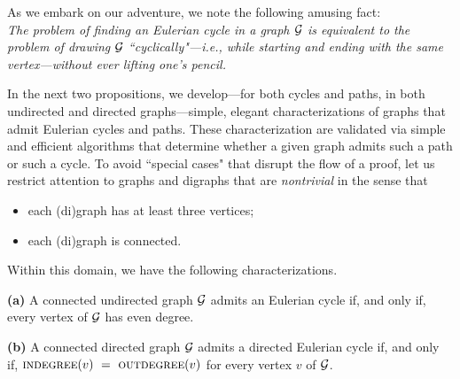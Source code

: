 As we embark on our adventure, we note the following amusing fact: \\
{\em The problem of finding an Eulerian cycle in a graph $\mbox{$\cal G$}$ is
equivalent to the problem of drawing $\mbox{$\cal G$}$ ``cyclically"---i.e., while
starting and ending with the same vertex---without ever lifting one's
pencil.} 

\medskip

In the next two propositions, we develop---for both cycles and paths, in both undirected and
directed graphs---simple, elegant characterizations of graphs that admit Eulerian cycles and paths.
These characterization are validated via simple and efficient algorithms that determine
whether a given graph admits such a path or such a cycle.  To avoid ``special cases" that
disrupt the flow of a proof, let us restrict attention to graphs and digraphs that are {\em nontrivial}
in the sense that
\begin{itemize}
\item
each (di)graph has at least three vertices;
\item
each (di)graph is connected.
\end{itemize}
Within this domain, we have the following characterizations.

\begin{prop}
\label{thm:eulerian-cycle}
{\bf (a)}
A connected undirected graph $\mbox{$\cal G$}$ admits an Eulerian cycle if, and only if,
every vertex of $\mbox{$\cal G$}$ has even degree.

{\bf (b)}
A connected directed graph $\mbox{$\cal G$}$ admits a directed Eulerian cycle if, and only if,
$\mbox{\sc indegree}(v) \ = \ \mbox{\sc outdegree}(v)$ for every vertex $v$ of $\mbox{$\cal G$}$.
\end{prop}


